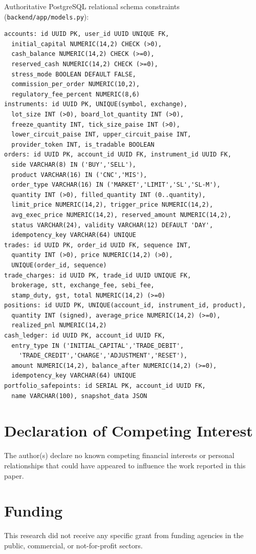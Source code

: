 \documentclass[12pt]{article}
\begin{document}
Authoritative PostgreSQL relational schema constraints (\texttt{backend/app/models.py}):
\begin{lstlisting}
accounts: id UUID PK, user_id UUID UNIQUE FK,
  initial_capital NUMERIC(14,2) CHECK (>0),
  cash_balance NUMERIC(14,2) CHECK (>=0),
  reserved_cash NUMERIC(14,2) CHECK (>=0),
  stress_mode BOOLEAN DEFAULT FALSE,
  commission_per_order NUMERIC(10,2),
  regulatory_fee_percent NUMERIC(8,6)
instruments: id UUID PK, UNIQUE(symbol, exchange),
  lot_size INT (>0), board_lot_quantity INT (>0),
  freeze_quantity INT, tick_size_paise INT (>0),
  lower_circuit_paise INT, upper_circuit_paise INT,
  provider_token INT, is_tradable BOOLEAN
orders: id UUID PK, account_id UUID FK, instrument_id UUID FK,
  side VARCHAR(8) IN ('BUY','SELL'),
  product VARCHAR(16) IN ('CNC','MIS'),
  order_type VARCHAR(16) IN ('MARKET','LIMIT','SL','SL-M'),
  quantity INT (>0), filled_quantity INT (0..quantity),
  limit_price NUMERIC(14,2), trigger_price NUMERIC(14,2),
  avg_exec_price NUMERIC(14,2), reserved_amount NUMERIC(14,2),
  status VARCHAR(24), validity VARCHAR(12) DEFAULT 'DAY',
  idempotency_key VARCHAR(64) UNIQUE
trades: id UUID PK, order_id UUID FK, sequence INT,
  quantity INT (>0), price NUMERIC(14,2) (>0),
  UNIQUE(order_id, sequence)
trade_charges: id UUID PK, trade_id UUID UNIQUE FK,
  brokerage, stt, exchange_fee, sebi_fee,
  stamp_duty, gst, total NUMERIC(14,2) (>=0)
positions: id UUID PK, UNIQUE(account_id, instrument_id, product),
  quantity INT (signed), average_price NUMERIC(14,2) (>=0),
  realized_pnl NUMERIC(14,2)
cash_ledger: id UUID PK, account_id UUID FK,
  entry_type IN ('INITIAL_CAPITAL','TRADE_DEBIT',
    'TRADE_CREDIT','CHARGE','ADJUSTMENT','RESET'),
  amount NUMERIC(14,2), balance_after NUMERIC(14,2) (>=0),
  idempotency_key VARCHAR(64) UNIQUE
portfolio_safepoints: id SERIAL PK, account_id UUID FK,
  name VARCHAR(100), snapshot_data JSON
\end{lstlisting}

\section*{Declaration of Competing Interest}
The author(s) declare no known competing financial interests or personal relationships that could have appeared to influence the work reported in this paper.

\section*{Funding}
This research did not receive any specific grant from funding agencies in the public, commercial, or not-for-profit sectors.
\end{document}

